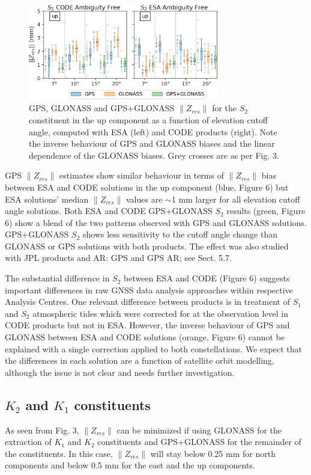 \documentclass[se, manuscript]{copernicus}
\begin{document}
\begin{figure}[t]
\includegraphics[width=8.3cm]{fig06.png}
\caption{GPS, GLONASS and GPS+GLONASS $\|Z_{res}\|$ for the $S_2$ constituent in the up component as a function of elevation cutoff angle, computed with ESA (left) and CODE products (right). Note the inverse behaviour of GPS and GLONASS biases and the linear dependence of the GLONASS biases. Grey crosses are as per Fig. 3.}
\end{figure}

GPS $\|Z_{res}\|$ estimates show similar behaviour in terms of $\|Z_{res}\|$ bias between ESA and CODE solutions in the up component (blue, Figure 6) but ESA solutions' median $\|Z_{res}\|$ values are $\sim$1 mm larger for all elevation cutoff angle solutions.
Both ESA and CODE GPS+GLONASS $S_2$ results (green, Figure 6) show a blend of the two patterns observed with GPS and GLONASS solutions. GPS+GLONASS $S_2$ shows less sensitivity to the cutoff angle change than GLONASS or GPS solutions with both products. The effect was also studied with JPL products and AR: GPS and GPS AR; see Sect. 5.7.

The substantial difference in $S_2$ between ESA and CODE (Figure 6) suggests important differences in raw GNSS data analysis approaches within respective Analysis Centres. One relevant difference between products is in treatment of $S_1$ and $S_2$ atmospheric tides which were corrected for at the observation level in CODE products but not in ESA. However, the inverse behaviour of GPS and GLONASS between ESA and CODE solutions (orange, Figure 6) cannot be explained with a single correction applied to both constellations. We expect that the differences in each solution are a function of satellite orbit modelling, although the issue is not clear and needs further investigation.


\subsection{$K_2$ and $K_1$ constituents}
As seen from Fig. 3, $\| Z_{res}\|$ can be minimized if using GLONASS for the extraction of $K_1$ and $K_2$ constituents and GPS+GLONASS for the remainder of the constituents. In this case, $\| Z_{res}\|$ will stay below 0.25 mm for north components and below 0.5 mm for the east and the up components.
\end{document}
